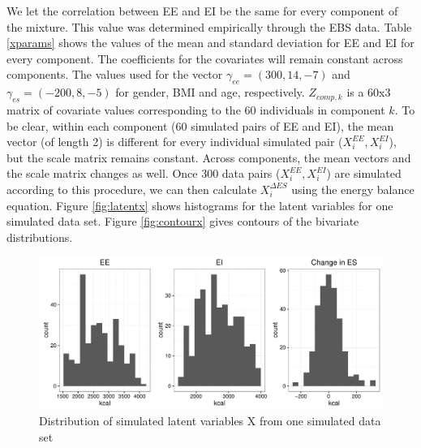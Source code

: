 \documentclass[11pt]{article}\usepackage[]{graphicx}\usepackage[]{color}
\makeatletter
\def\maxwidth{ %
  \ifdim\Gin@nat@width>\linewidth
    \linewidth
  \else
    \Gin@nat@width
  \fi
}
\newenvironment{knitrout}{}{} %
\makeatother
\begin{document}

We let the correlation between EE and EI be the same for every component of the mixture. This value was determined empirically through the EBS data. Table \eqref{xparams} shows the values of the mean and standard deviation for EE and EI for every component. The coefficients for the covariates will remain constant across components. The values used for the vector $\gamma_{ee}=(300,14,-7)$ and $\gamma_{es}=(-200,8,-5)$ for gender, BMI and age, respectively. $Z_{comp,k}$ is a 60x3 matrix of covariate values corresponding to the 60 individuals in component $k$. To be clear, within each component (60 simulated pairs of EE and EI), the mean vector (of length 2) is different for every individual simulated pair ($X_i^{EE}, X_i^{EI}$), but the scale matrix remains constant. Across components, the mean vectors and the scale matrix changes as well. Once 300 data pairs ($X_i^{EE}, X_i^{EI}$) are simulated according to this procedure, we can then calculate  $X_i^{\Delta ES}$ using the energy balance equation. Figure \eqref{fig:latentx} shows histograms for the latent variables for one simulated data set. Figure \eqref{fig:contourx} gives contours of the bivariate distributions.


\begin{knitrout}
\color{fgcolor}\begin{figure}
\includegraphics[width=\maxwidth]{figure/latentx-1} \caption[Distribution of simulated latent variables X from one simulated data set]{Distribution of simulated latent variables X from one simulated data set}\label{fig:latentx}
\end{figure}


\end{knitrout}
\end{document}
